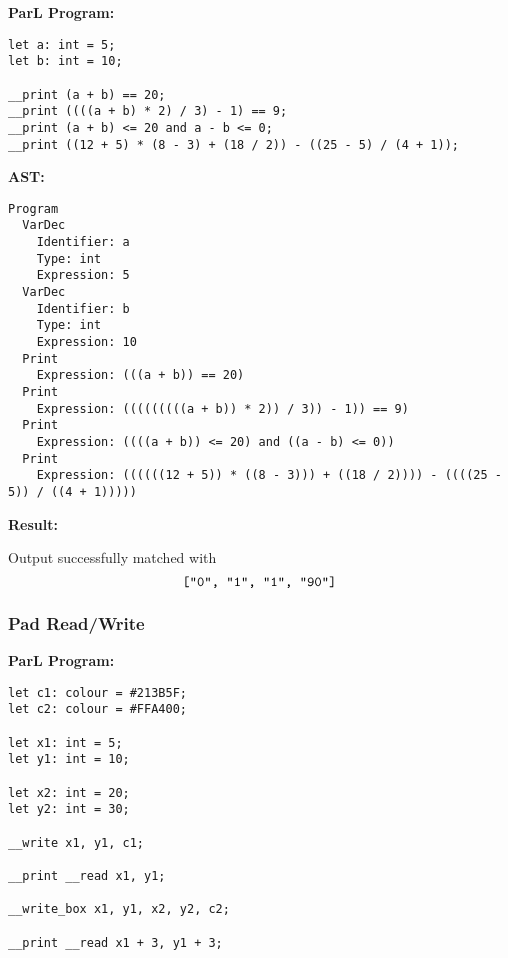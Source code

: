 \textbf{ParL Program:}

{
  \lstset{xleftmargin=0.1\textwidth}

  \begin{lstlisting}
let a: int = 5;
let b: int = 10;

__print (a + b) == 20;
__print ((((a + b) * 2) / 3) - 1) == 9;
__print (a + b) <= 20 and a - b <= 0;
__print ((12 + 5) * (8 - 3) + (18 / 2)) - ((25 - 5) / (4 + 1));
\end{lstlisting}

}

\textbf{AST:}

{

  \lstset{xleftmargin=0\textwidth}

  \begin{lstlisting}
Program
  VarDec
    Identifier: a
    Type: int
    Expression: 5
  VarDec
    Identifier: b
    Type: int
    Expression: 10
  Print
    Expression: (((a + b)) == 20)
  Print
    Expression: (((((((((a + b)) * 2)) / 3)) - 1)) == 9)
  Print
    Expression: ((((a + b)) <= 20) and ((a - b) <= 0))
  Print
    Expression: ((((((12 + 5)) * ((8 - 3))) + ((18 / 2)))) - ((((25 - 5)) / ((4 + 1)))))
\end{lstlisting}

}

\textbf{Result:}

Output successfully matched with $$\texttt{["0", "1", "1", "90"]}$$

\newpage

\subsubsection*{Pad Read/Write}

\textbf{ParL Program:}

{
  \lstset{xleftmargin=0.2\textwidth}

  \begin{lstlisting}
let c1: colour = #213B5F;
let c2: colour = #FFA400;

let x1: int = 5;
let y1: int = 10;

let x2: int = 20;
let y2: int = 30;

__write x1, y1, c1;

__print __read x1, y1;

__write_box x1, y1, x2, y2, c2;

__print __read x1 + 3, y1 + 3;
\end{lstlisting}

}

